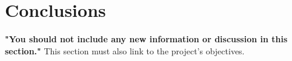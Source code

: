 \chapter{Conclusions}
\textbf{"You should not include any new information or discussion in this section."}
This section must also link to the project's objectives.